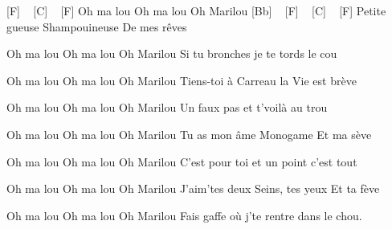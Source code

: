 [F] ~ [C] ~ [F] 
Oh ma lou Oh ma lou Oh Marilou
[Bb] ~ [F] ~ [C] ~ [F] 
Petite gueuse Shampouineuse De mes rêves

Oh ma lou Oh ma lou Oh Marilou
Si tu bronches je te tords le cou

Oh ma lou Oh ma lou Oh Marilou
Tiens-toi à Carreau la Vie est brève


Oh ma lou Oh ma lou Oh Marilou
Un faux pas et t'voilà au trou

Oh ma lou Oh ma lou Oh Marilou
Tu as mon âme Monogame Et ma sève

Oh ma lou Oh ma lou Oh Marilou
C'est pour toi et un point c'est tout

Oh ma lou Oh ma lou Oh Marilou
J'aim'tes deux Seins, tes yeux Et ta fève

Oh ma lou Oh ma lou Oh Marilou
Fais gaffe où j'te rentre dans le chou. 